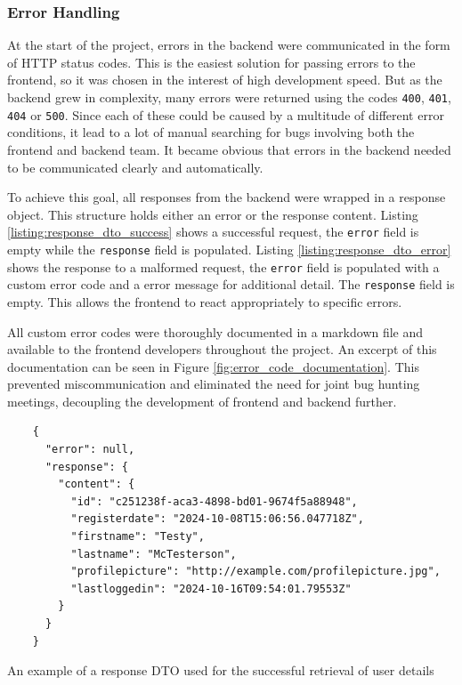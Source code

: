 \newpage{}

\subsubsection{Error Handling}

At the start of the project, errors in the backend were communicated in the form
of HTTP status codes. This is the easiest solution for passing errors to the
frontend, so it was chosen in the interest of high development speed. But as the
backend grew in complexity, many errors were returned using the codes
\texttt{400}, \texttt{401}, \texttt{404} or \texttt{500}. Since each of these
could be caused by a multitude of different error conditions, it lead to a lot
of manual searching for bugs involving both the frontend and backend team. It
became obvious that errors in the backend needed to be communicated clearly and
automatically.

To achieve this goal, all responses from the backend were wrapped in a response
object. This structure holds either an error or the response content. Listing
\ref{listing:response_dto_success} shows a successful request, the
\texttt{error} field is empty while the \texttt{response} field is populated.
Listing \ref{listing:response_dto_error} shows the response to a malformed
request, the \texttt{error} field is populated with a custom error code and a
error message for additional detail. The \texttt{response} field is empty. This
allows the frontend to react appropriately to specific errors.

All custom error codes were thoroughly documented in a markdown file and
available to the frontend developers throughout the project. An excerpt of this
documentation can be seen in Figure \ref{fig:error_code_documentation}. This
prevented miscommunication and eliminated the need for joint bug hunting
meetings, decoupling the development of frontend and backend further.



\begin{listing}[htbp]
  \centering{}
  \begin{minipage}{0.775\textwidth}
  \begin{verbatim}
    {
      "error": null,
      "response": {
        "content": {
          "id": "c251238f-aca3-4898-bd01-9674f5a88948",
          "registerdate": "2024-10-08T15:06:56.047718Z",
          "firstname": "Testy",
          "lastname": "McTesterson",
          "profilepicture": "http://example.com/profilepicture.jpg",
          "lastloggedin": "2024-10-16T09:54:01.79553Z"
        }
      }
    }
  \end{verbatim}
  \end{minipage}
  \caption{An example of a response DTO used for the successful retrieval of user details}
  \label{listing:response_dto_success}
\end{listing}

